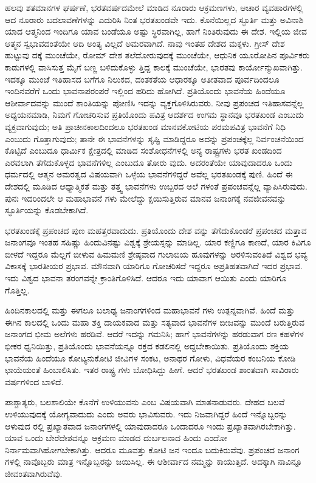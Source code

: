 ಹಲವು ಶತಮಾನಗಳ ಘರ್ಷಣೆ, ಭರತವರ್ಷದಮೇಲೆ ಮಾಡಿದ ನೂರಾರು ಆಕ್ರಮಣಗಳು, ಆಚಾರ ವ್ಯವಹಾರಗಳಲ್ಲಿ ಆದ ನೂರಾರು ಬದಲಾವಣೆಗಳನ್ನು ಎದುರಿಸಿ ನಿಂತ ಭರತಖಂಡವೇ ಇದು. ಕೊನೆಯಿಲ್ಲದ ಸ್ಫೂರ್ತಿ ಮತ್ತು ಅವಿನಾಶಿ ಯಾದ ಆತ್ಮನಿಂದ ಇಂದಿಗೂ ಯಾವ ಬಂಡೆಯೂ ಅಷ್ಟು ಸ್ಥಿರವಾಗಿಲ್ಲ, ಹಾಗೆ ನಿಂತಿರುವುದು ಈ ದೇಶ. ಇಲ್ಲಿಯ ಜೀವ ಆತ್ಮನ ಸ್ವಭಾವದಂತೆಯೇ ಆದಿ ಅಂತ್ಯ ವಿಲ್ಲದೆ ಅಮರವಾಗಿದೆ. ನಾವು ಇಂತಹ ದೇಶದ ಮಕ್ಕಳು. ಗ್ರೀಸ್ ದೇಶ ಹುಟ್ಟುವು ದಕ್ಕೆ ಮುಂಚೆಯೇ, ರೋಮ್ ದೇಶ ತಲೆದೋರುವುದಕ್ಕೆ ಮುಂಚೆಯೇ, ಆಧುನಿಕ ಯೂರೋಪಿನ ಪೂರ್ವಿಕರು ಕಾಡುಗಳಲ್ಲಿ ವಾಸಿಸುತ್ತ ಮೈಗೆ ಬಣ್ಣ ಬಳಿದುಕೊಳ್ಳು ತ್ತಿದ್ದ ಕಾಲಕ್ಕೆ ಮುಂಚೆಯೇ, ಭಾರತವು ಕಾರ್ಯೋನ್ಮುಖವಾಗಿತ್ತು. ಇದಕ್ಕೂ ಮುಂಚೆ ಇತಿಹಾಸದ ಬಗೆಗೂ ನಿಲುಕದ, ದಂತಕತೆಯ ಆಧಾರಕ್ಕೂ ಅತೀತವಾದ ಪೂರ್ವದಿಂದಲೂ ಇಂದಿನವರೆಗೆ ಒಂದು ಭಾವನಾಪರಂಪರೆ ಇಲ್ಲಿಂದ ಹರಿದು ಹೋಗಿದೆ. ಪ್ರತಿಯೊಂದು ಭಾವನೆಯ ಹಿಂದೆಯೂ ಆಶೀರ್ವಾದವನ್ನು ಮುಂದೆ ಶಾಂತಿಯನ್ನು ಪೋಣಿಸಿ ಇದನ್ನು ವ್ಯಕ್ತಗೊಳಿಸಿರುವರು. ನೀವು ಪ್ರಪಂಚದ ಇತಿಹಾಸವನ್ನೆಲ್ಲ ಅಧ್ಯಯನಮಾಡಿ, ನಿಮಗೆ ಗೋಚರಿಸುವ ಪ್ರತಿಯೊಂದು ಪವಿತ್ರ ಆದರ್ಶದ ಉಗಮ ಸ್ಥಾನವೂ ಭರತಖಂಡ ಎಂಬುದು ವ್ಯಕ್ತವಾಗುವುದು; ಅತಿ ಪ್ರಾಚೀನಕಾಲದಿಂದಲೂ ಭರತಖಂಡ ಮಾನವಕೋಟಿಯ ಪರಮಪವಿತ್ರ ಭಾವನೆಗೆ ನಿಧಿ ಎಂಬುದು ಗೊತ್ತಾಗುವುದು; ತಾನೇ ಈ ಭಾವನೆಗಳನ್ನು ಸೃಷ್ಟಿ ಮಾಡಿದ್ದರೂ ಅದನ್ನು ಪ್ರಪಂಚಕ್ಕೆಲ್ಲ ನಿರ್ವಂಚನೆಯಿಂದ ಕೊಟ್ಟಿದೆ ಎಂಬುದೂ ಧಾರ್ಮಿಕ ಕ್ಷೇತ್ರದಲ್ಲಿ ಮಾಡಿದ ಸಂಶೋಧನೆಗಳಲ್ಲಿ ಅನ್ಯ ರಾಷ್ಟ್ರಗಳು ಭರತ ಖಂಡದಿಂದ ಎರವಲಾಗಿ ತೆಗೆದುಕೊಳ್ಳದ ಭಾವನೆಗಳಿಲ್ಲ ಎಂಬುದೂ ತೋರು ವುದು. ಅದರಂತೆಯೇ ಯಾವುದಾದರೂ ಒಂದು ಧರ್ಮದಲ್ಲಿ ಆತ್ಮನ ಅಮರತ್ವದ ವಿಷಯವಾಗಿ ಒಳ್ಳೆಯ ಭಾವನೆಗಳಿದ್ದರೆ ಅವೆಲ್ಲ ಭರತಖಂಡಕ್ಕೆ ಪುಣಿ. ಹಿಂದೆ ಈ ದೇಶದಲ್ಲಿ ಮೂಡಿದ ಆಧ್ಯಾತ್ಮಿಕತೆ ಮತ್ತು ತತ್ತ್ವ ಭಾವನೆಗಳು ಉಬ್ಬರದ ಅಲೆ ಗಳಂತೆ ಪ್ರಪಂಚವನ್ನೆಲ್ಲ ವ್ಯಾಪಿಸಿರುವುದು. ಪುನಃ ಇದರಿಂದಲೇ ಆ ಮಹಾಭಾವನೆ ಗಳು ಮೇಲೆದ್ದು ಕ್ಷಯಿಸುತ್ತಿರುವ ಮಾನವ ಜನಾಂಗಕ್ಕೆ ನವಜೀವನವನ್ನು ಸ್ಫೂರ್ತಿಯನ್ನು ಕೊಡಬೇಕಾಗಿದೆ.

ಭರತಖಂಡಕ್ಕೆ ಪ್ರಪಂಚದ ಪುಣ ಮಹತ್ತರವಾದುದು. ಪ್ರತಿಯೊಂದು ದೇಶ ವನ್ನು ತೆಗೆದುಕೊಂಡರೆ ಪ್ರಪಂಚದ ಮತ್ತಾವ ಜನಾಂಗವೂ ಇಂತಹ ಸಹಿಷ್ಣು ಹಿಂದುವಿನಷ್ಟು ವಿಶ್ವಕ್ಕೆ ಶ್ರೇಯಸ್ಸನ್ನು ಮಾಡಿಲ್ಲ. ಯಾರ ಕಣ್ಣಿಗೂ ಕಾಣದೆ, ಯಾರ ಕಿವಿಗೂ ಬೀಳದೆ ಇದ್ದರೂ ಮೆಲ್ಲಗೆ ಬೀಳುವ ಹಿಮಮಣಿ ಶ್ರೇಷ್ಠವಾದ ಗುಲಾಬಿಯ ಹೂವುಗಳನ್ನು ಅರಳಿಸುವಂತಿದೆ ವಿಶ್ವದ ಭವ್ಯ ವಿಕಾಸಕ್ಕೆ ಭಾರತೀಯರ ಪ್ರಭಾವ. ಮೌನವಾಗಿ ಯಾರಿಗೂ ಗೋಚರಿಸದೆ ಇದ್ದರೂ ಅಪ್ರತಿಹತವಾಗಿದೆ ಇದರ ಪ್ರಭಾವ. ಇದು ವಿಶ್ವದ ಭಾವನಾ ತರಂಗವನ್ನೇ ಕ್ರಾಂತಿಗೊಳಿಸಿದೆ. ಆದರೂ ಇದು ಯಾವಾಗ ಆಯಿತು ಎಂದು ಯಾರಿಗೂ ಗೊತ್ತಿಲ್ಲ.

ಹಿಂದಿನಕಾಲದಲ್ಲಿ ಮತ್ತು ಈಗಲೂ ಬಲಾಢ್ಯ ಜನಾಂಗಗಳಿಂದ ಮಹಾಭಾವನೆ ಗಳು ಉತ್ಪನ್ನವಾಗಿವೆ. ಹಿಂದೆ ಮತ್ತು ಈಗಿನ ಕಾಲದಲ್ಲಿ ಒಂದು ಮಹಾ ಶಕ್ತಿ ದಾಯಕವಾದ ಮತ್ತು ಸತ್ಯವಾದ ಭಾವನೆಗಳ ಬೀಜವನ್ನು ಮುಂದೆ ಬರುತ್ತಿರುವ ಜನಾಂಗದ ಭೀಮ ಅಲೆಗಳು ಹರಡಿವೆ. ಆದರೆ ಇದನ್ನು ಗಮನಿಸಿ; ಹಾಗೆ ಭಾವನೆಗಳನ್ನು ಹರಡುವಾಗ ರಣ ಕಹಳೆಗಳ ಭೀಕರ ಧ್ವನಿಯಿತ್ತು, ಪ್ರತಿಯೊಂದು ಭಾವನೆಯನ್ನೂ ರಕ್ತದ ಕಡಲಿನಲ್ಲಿ ಅದ್ದಬೇಕಾಯಿತು. ಪ್ರತಿಯೊಂದು ಶಕ್ತಿಯ ಭಾವನೆಯ ಹಿಂದೆಯೂ ಕೋಟ್ಯನುಕೋಟಿ ಜೀವಿಗಳ ಸಂಕಟ, ಅನಾಥರ ಗೋಳು, ವಿಧವೆಯರ ಕಂಬನಿಯ ಕೋಡಿ ಛಾಯೆಯಂತೆ ಹಿಂಬಾಲಿಸಿತು. ಇತರ ರಾಷ್ಟ್ರ ಗಳು ಬೋಧಿಸಿದ್ದು ಹೀಗೆ. ಆದರೆ ಭರತಖಂಡ ಶಾಂತವಾಗಿ ಸಾವಿರಾರು ವರ್ಷಗಳಿಂದ ಬಾಳಿದೆ.

ಪಾಶ್ಚಾತ್ಯರು, ಬಲಶಾಲಿಯೇ ಕೊನೆಗೆ ಉಳಿಯುವನು ಎಂಬ ವಿಷಯವಾಗಿ ಮಾತನಾಡುವರು. ದೇಹದ ಬಲವೆ ಉಳಿಯುವುದಕ್ಕೆ ಯೋಗ್ಯವಾದುದು ಎಂದು ಅವರು ಭಾವಿಸುವರು. ಇದು ನಿಜವಾಗಿದ್ದರೆ ಹಿಂದೆ ಇನ್ನೊಬ್ಬರನ್ನು ಆಳುವುದ ರಲ್ಲಿ ಪ್ರಖ್ಯಾತವಾದ ಜನಾಂಗಗಳಲ್ಲಿ ಯಾವುದಾದರೂ ಒಂದಾದರೂ ಇಂದು ಪ್ರಖ್ಯಾತವಾಗಿರಬೇಕಾಗಿತ್ತು. ಯಾವ ಒಂದು ಬೇರೆದೇಶವನ್ನೂ ಆಕ್ರಮಣ ಮಾಡದ ದುರ್ಬಲನಾದ ಹಿಂದು ಎಂದೋ ನಿರ್ನಾಮವಾಗಿಹೋಗಬೇಕಾಗಿತ್ತು. ಆದರೂ ಮೂವತ್ತು ಕೋಟಿ ಜನ ಇಂದೂ ಬದುಕಿರುವೆವು. ಪ್ರಪಂಚದ ಜನಾಂಗ ಗಳಲ್ಲಿ ನಾವೊಬ್ಬರು ಮಾತ್ರ ಇನ್ನೊಬ್ಬರನ್ನು ಜಯಿಸಿಲ್ಲ. ಈ ಆಶೀರ್ವಾದ ನಮ್ಮನ್ನು ಕಾಯುತ್ತಿದೆ. ಅದಕ್ಕಾಗಿ ನಾವಿನ್ನೂ ಜೀವಂತವಾಗಿರುವೆವು.

